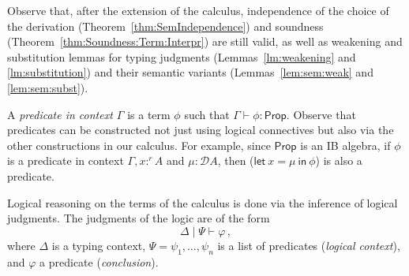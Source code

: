 \documentclass[a4paper,UKenglish,cleveref, autoref, thm-restate]{lipics-v2021}
\newcommand{\mprod}{\otimes}
\newcommand{\D}{\mathcal{D}}
\newcommand{\ts}{\vdash}
\newcommand{\hastype}[3]{#1\ts #2 : #3}
\newcommand{\letIn}[2]{\mathsf{let~} #1 \mathsf{~in~} #2}
\newcommand{\Prop}{\mathsf{Prop}}
\newcommand{\logicJ}[3][\Delta]{#1 \mid #2 \vdash #3}
\begin{document}
Observe that, after the extension of the calculus, independence of the choice of the derivation (Theorem~\ref{thm:SemIndependence}) and soundness (Theorem~\ref{thm:Soundness:Term:Interpr}) are still valid, as well as weakening and substitution lemmas for typing judgments (Lemmas~\ref{lm:weakening} and \ref{lm:substitution}) and their semantic variants (Lemmas~\ref{lem:sem:weak} and \ref{lem:sem:subst}).


\smallskip
A \emph{predicate in context $\Gamma$} is a term $\phi$ such that $\hastype{\Gamma}{\phi}{\Prop}$. 
Observe that predicates can be constructed not just using 
logical connectives
but also via the other constructions in our calculus. For example, since
$\Prop$ is an IB algebra,  %
if $\phi$ is a predicate in context $\Gamma, x:^r A$
and $\mu : \D A$, then ($\letIn{x = \mu}{\phi}$) is also a predicate. %

Logical reasoning on the terms of the calculus is done via the inference of logical judgments. The judgments of the logic are of the form 
\[
\logicJ[\Delta]{\Psi}{\varphi} \,,
\]
where $\Delta$ is a typing context, 
$\Psi = \psi_1, \dots, \psi_n$ is a list of predicates (\emph{logical context}), and $\varphi$ a predicate (\emph{conclusion}).
%
\end{document}
